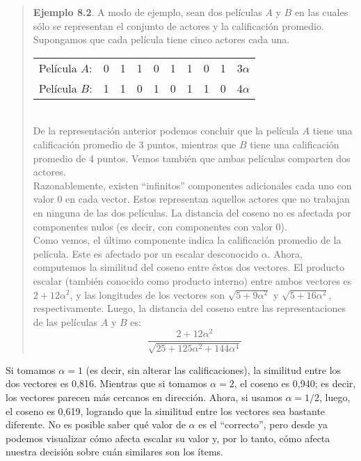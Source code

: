 				\begin{quote}
					\textbf{Ejemplo 8.2}. A modo de ejemplo, sean dos películas $A$ y $B$ en las cuales sólo se representan el conjunto de actores y la calificación promedio. Supongamos que cada película tiene cinco actores cada una.
					
					\begin{tabular}{llllllllll}
						Película $A$: & 0 & 1 & 1 & 0 & 1 & 1 & 0 & 1 & 3$\alpha$ \\
						Película $B$: & 1 & 1 & 0 & 1 & 0 & 1 & 1 & 0 & 4$\alpha$
					\end{tabular} \\	
					
					De la representación anterior podemos concluir que la película $A$ tiene una calificación promedio de 3 puntos, mientras que $B$ tiene una calificación promedio de 4 puntos. Vemos también que ambas películas comparten dos actores. \\
					
					Razonablemente, existen \enquote{infinitos} componentes adicionales cada uno con valor 0 en cada vector. Estos representan aquellos actores que no trabajan en ninguna de las dos películas. La distancia del coseno no es afectada por componentes nulos (es decir, con componentes con valor 0). \\
					
					Como vemos, el último componente indica la calificación promedio de la película. Este es afectado por un escalar desconocido $\alpha$. Ahora, computemos la similitud del coseno entre éstos dos vectores. El producto escalar (también conocido como producto interno) entre ambos vectores es $2 + 12\alpha^2$, y las longitudes de los vectores son $\sqrt{5 + 9\alpha^2}$ y $\sqrt{5 + 16\alpha^2}$, respectivamente. Luego, la distancia del coseno entre las representaciones de las películas $A$ y $B$ es:
					\begin{equation}
							\frac{2 + 12\alpha^2}{\sqrt{25 + 125\alpha^2 + 144\alpha^4}}
					\end{equation}
				\end{quote}
				
				Si tomamos $\alpha = 1$ (es decir, sin alterar las calificaciones), la similitud entre los dos vectores es 0,816. Mientras que si tomamos $\alpha = 2$, el coseno es 0,940; es decir, los vectores parecen más cercanos en dirección. Ahora, si usamos $\alpha = 1/2$, luego, el coseno es 0,619, logrando que la similitud entre los vectores sea bastante diferente. No es posible saber qué valor de $\alpha$ es el \enquote{correcto}, pero desde ya podemos visualizar cómo afecta escalar su valor y, por lo tanto, cómo afecta nuestra decisión sobre cuán similares son los ítems.
				
